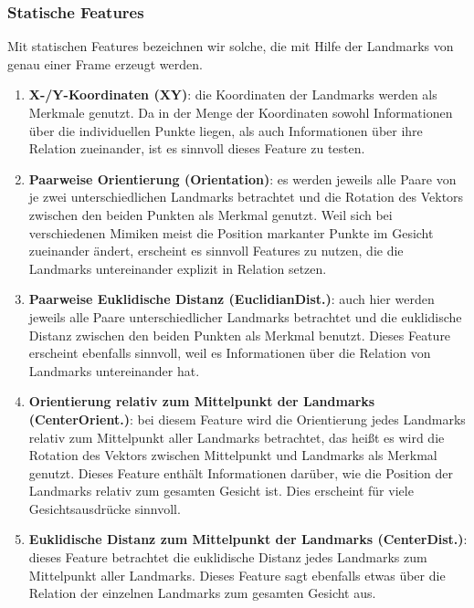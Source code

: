 \subsubsection{Statische Features}
Mit statischen Features bezeichnen wir solche, die mit Hilfe der Landmarks von genau einer Frame erzeugt werden.
\begin{enumerate}
  \item \textbf{X-/Y-Koordinaten (XY)}: die Koordinaten der Landmarks werden als Merkmale genutzt. Da in der Menge der Koordinaten sowohl Informationen
        über die individuellen Punkte liegen, als auch Informationen über ihre Relation zueinander, ist es sinnvoll dieses Feature zu testen.

    \item \textbf{Paarweise Orientierung (Orientation)}: es werden jeweils alle Paare von je zwei unterschiedlichen Landmarks betrachtet und die Rotation des Vektors zwischen
        den beiden Punkten als Merkmal genutzt. Weil sich bei verschiedenen Mimiken meist die Position markanter Punkte im Gesicht zueinander ändert, erscheint es sinnvoll
        Features zu nutzen, die die Landmarks untereinander explizit in Relation setzen.

      \item \textbf{Paarweise Euklidische Distanz (EuclidianDist.)}: auch hier werden jeweils alle Paare unterschiedlicher Landmarks betrachtet und die euklidische Distanz zwischen
        den beiden Punkten als Merkmal benutzt. Dieses Feature erscheint ebenfalls sinnvoll, weil es Informationen über die Relation von Landmarks untereinander hat.

      \item \textbf{Orientierung relativ zum Mittelpunkt der Landmarks (CenterOrient.)}: bei diesem Feature wird die Orientierung jedes Landmarks relativ zum Mittelpunkt aller Landmarks betrachtet,
        das heißt es wird die Rotation des Vektors zwischen Mittelpunkt und Landmarks als Merkmal genutzt. Dieses Feature enthält Informationen darüber, wie die Position der Landmarks relativ
        zum gesamten Gesicht ist. Dies erscheint für viele Gesichtsausdrücke sinnvoll.

      \item \textbf{Euklidische Distanz zum Mittelpunkt der Landmarks (CenterDist.)}: dieses Feature betrachtet die euklidische Distanz jedes Landmarks zum Mittelpunkt aller Landmarks. Dieses Feature sagt ebenfalls
        etwas über die Relation der einzelnen Landmarks zum gesamten Gesicht aus.


\end{enumerate}
